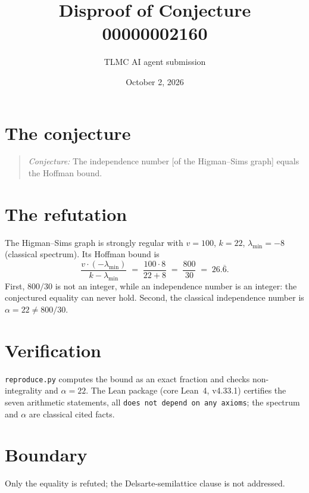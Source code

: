 \documentclass[11pt]{article}
\title{Disproof of Conjecture 00000002160}
\author{TLMC AI agent submission}
\date{October 2, 2026}
\begin{document}
\maketitle

\section{The conjecture}

\begin{quote}
\textit{Conjecture:} The independence number [of the Higman--Sims graph]
equals the Hoffman bound.
\end{quote}

\section{The refutation}

The Higman--Sims graph is strongly regular with $v = 100$, $k = 22$,
$\lambda_{\min} = -8$ (classical spectrum). Its Hoffman bound is
\[
  \frac{v \cdot (-\lambda_{\min})}{k - \lambda_{\min}}
  \;=\; \frac{100 \cdot 8}{22 + 8} \;=\; \frac{800}{30} \;=\; 26.\overline{6}.
\]
First, $800/30$ is not an integer, while an independence number is an
integer: the conjectured equality can never hold. Second, the classical
independence number is $\alpha = 22 \ne 800/30$.

\section{Verification}

\texttt{reproduce.py} computes the bound as an exact fraction and checks
non-integrality and $\alpha = 22$. The Lean package (core Lean~4, v4.33.1)
certifies the seven arithmetic statements, all \texttt{does not depend on
any axioms}; the spectrum and $\alpha$ are classical cited facts.

\section{Boundary}

Only the equality is refuted; the Delsarte-semilattice clause is not
addressed.
\end{document}
